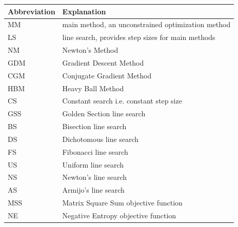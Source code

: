 \documentclass[english, 12pt, a4paper, sci, utf8, a-1b, online, table]{aaltothesis}
\begin{document}
\begin{table}[H]
  \label{tab:abbreviations}
  \centering
  \begin{tabular}{|l|l|}
  \hline
  \rowcolor{gray!25}
  \textbf{Abbreviation} & \textbf{Explanation} \\
  \hline
  MM                    & main method, an unconstrained optimization method                               \\
  LS                    & line search, provides step sizes for main methods                               \\
  NM                    & Newton's Method                                                                 \\
  GDM                   & Gradient Descent Method                                                         \\
  CGM                   & Conjugate Gradient Method                                                       \\
  HBM                   & Heavy Ball Method                                                               \\
  CS                    & Constant search i.e. constant step size                                         \\
  GSS                   & Golden Section line search                                                      \\
  BS                    & Bisection line search                                                           \\
  DS                    & Dichotomous line search                                                         \\
  FS                    & Fibonacci line search                                                           \\
  US                    & Uniform line search                                                             \\
  NS                    & Newton's line search                                                            \\
  AS                    & Armijo's line search                                                            \\
  MSS                   & Matrix Square Sum objective function                                            \\
  NE                    & Negative Entropy objective function                                             \\
  \hline
  \end{tabular}
\end{table}
\end{document}
